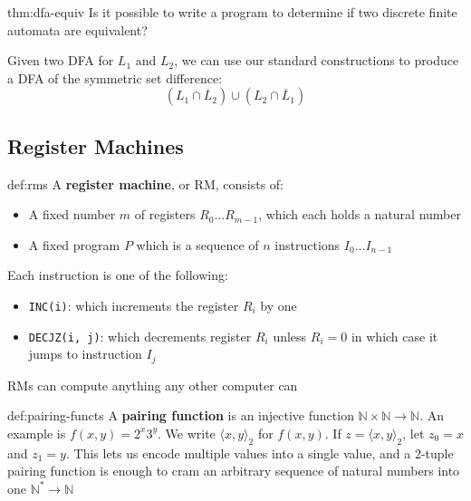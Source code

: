 \documentclass[landscape, 8pt]{extarticle}
\begin{document}
\begin{multicols}{3}
\begin{thm}{thm:dfa-equiv}{}
Is it possible to write a program to determine if two discrete finite automata are equivalent?

Given two DFA for $L_1$ and $L_2$, we can use our standard constructions to produce a DFA of the symmetric set difference:
\[(L_1 \cap \overline L_2) \cup (L_2 \cap \overline L_1)\]
\end{thm}


\newpage

\subsection*{Register Machines}

\begin{dfn}{def:rms}{}
A \textbf{register machine}, or RM, consists of:
\renewcommand\labelitemi{\tiny$\bullet$}
\begin{itemize}
    \setlength\itemsep{0em}
    \item A fixed number $m$ of registers $R_{0}\dots R_{m-1}$, which each holds a natural number
    \item A fixed program $P$ which is a sequence of $n$ instructions $I_{0} \dots I_{n-1}$
\end{itemize}
Each instruction is one of the following:
\renewcommand\labelitemi{\tiny$\bullet$}
\begin{itemize}
    \setlength\itemsep{0em}
    \item \texttt{INC(i)}: which increments the register $R_i$ by one
    \item \texttt{DECJZ(i, j)}: which decrements register $R_i$ unless $R_i = 0$ in which case it jumps to instruction $I_j$
\end{itemize}
RMs can compute anything any other computer can
\end{dfn}


\begin{dfn}{def:pairing-functs}{}
A \textbf{pairing function} is an injective function $\mathbb{N} \times \mathbb{N} \to \mathbb{N}$. An example is $f(x,y) = 2^{x}3^{y}$.
\newline
We write $\langle x,y\rangle_{2}$ for $f(x,y)$. If $z = \langle x,y\rangle_{2}$, let $z_{0} = x$ and $z_{1} = y$.
This lets us encode multiple values into a single value, and a 2-tuple pairing function is enough to cram an arbitrary sequence of natural numbers into one $\mathbb{N}^{*}\to \mathbb{N}$
\end{dfn}


\end{multicols}
\end{document}
